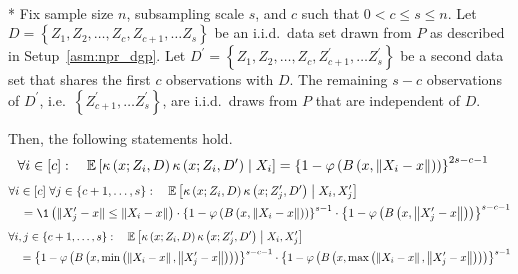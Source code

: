 \newpage
\begin{lem}[]\label{lem:cond_expec_kernel_prod}\mbox{}\\*
    Fix sample size $n$, subsampling scale $s$, and $c$ such that $0 < c \leq s \leq n$.
	Let $D = \left\{Z_1, Z_2, \dotsc, Z_c, Z_{c+1}, \dotsc Z_s \right\}$ be an i.i.d.\ data set drawn from $P$ as described in Setup~\ref{asm:npr_dgp}.
	Let $D^{\prime} = \left\{Z_1, Z_2, \dotsc, Z_c, Z_{c+1}^{\prime}, \dotsc Z_s^{\prime} \right\}$ be a second data set that shares the first $c$ observations with $D$.
	The remaining $s - c$ observations of $D^{\prime}$, i.e.\ $\left\{Z_{c+1}^{\prime}, \dotsc Z_s^{\prime} \right\}$, are i.i.d.\ draws from $P$ that are independent of $D$.

    Then, the following statements hold.
    \begin{equation}
        \begin{aligned}
            & \forall i \in [c]: \quad
            \mathbb{E}\left[\kappa\left(x; Z_{i}, D\right)\kappa\left(x; Z_{i}, D^{\prime}\right) \; \middle| \; X_i\right]
            = \left\{1-\varphi\left(B\left(x,\left\|X_{i}-x\right\|\right)\right)\right\}^{2s-c-1} 
        \end{aligned}
    \end{equation}
    \begin{equation}
        \begin{aligned}
            & \forall i \in [c] \; \forall j \in \{c+1, \dotsc, s\}: \quad
            \E\left[\kappa\left(x; Z_{i}, D\right)\kappa\left(x; Z_{j}^{\prime}, D^{\prime}\right) \; \middle| \; X_i, X_{j}^{\prime}\right]\\
            & \quad = \1\left(\|X_{j}^{\prime} - x\| \leq \|X_{i} - x\|\right)
            \cdot \left\{1-\varphi\left(B\left(x,\left\|X_{i}-x\right\|\right)\right)\right\}^{s-1} 
            \cdot \left\{1-\varphi\left(B\left(x,\left\|X_{j}^{\prime}-x\right\|\right)\right)\right\}^{s-c-1}
        \end{aligned}
    \end{equation}
    \begin{equation}
        \begin{aligned}
            & \forall i,j \in \{c+1, \dotsc, s\}: \quad
            \mathbb{E}\left[\kappa\left(x; Z_{i}, D\right)\kappa\left(x; Z_{j}^{\prime}, D^{\prime}\right) \; \middle| \; X_{i}, X_{j}^{\prime}\right] \\ 
            & \quad = \left\{1-\varphi\left(B\left(x, \min\left(\left\|X_{i} - x\right\|, \left\|X_{j}^{\prime}-x\right\|\right)\right)\right)\right\}^{s-c-1}
            \cdot \left\{1-\varphi\left(B\left(x,\max\left(\left\|X_{i} - x\right\|, \left\|X_{j}^{\prime}-x\right\|\right)\right)\right)\right\}^{s-1}
        \end{aligned}
    \end{equation}
\end{lem}

